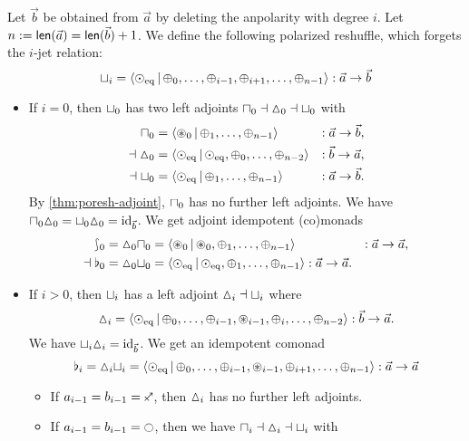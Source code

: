 \documentclass[a4paper]{memoir}
\begin{document}
\begin{example} \label{ex:cohesion}
	Let $\vec b$ be obtained from $\vec a$ by deleting the anpolarity with degree $i$.
	Let $n := \mathsf{len}(\vec a) = \mathsf{len}(\vec b) + 1$.
	We define the following polarized reshuffle, which forgets the $i$-jet relation:
	\[
		{\sqcup}_i = \mathopen{}\left\langle {\odot}_{\mathrm{eq}} \,\middle|\, {\oplus}_0, \ldots, {\oplus}_{i-1}, {\oplus}_{i+1}, \ldots, {\oplus}_{n-1} \right\rangle\mathclose{} : \vec a \to \vec b
	\]
	\begin{itemize}
		\item If $i = 0$, then ${\sqcup}_0$ has two left adjoints ${\sqcap}_0 \dashv {\vartriangle}_0 \dashv {\sqcup}_0$ with
		\begin{align*}
			{\sqcap}_0 &= \mathopen{}\left\langle {\oast}_0 \,\middle|\, {\oplus}_1, \ldots, {\oplus}_{n-1} \right\rangle\mathclose{} &: \vec a \to \vec b, \\
			\dashv
			{\vartriangle}_0 &= \mathopen{}\left\langle {\odot}_{\mathrm{eq}} \,\middle|\, {\odot}_{\mathrm{eq}}, {\oplus}_0, \ldots, {\oplus}_{n-2} \right\rangle\mathclose{} &: \vec b \to \vec a, \\
			\dashv
			{\sqcup}_0 &= \mathopen{}\left\langle {\odot}_{\mathrm{eq}} \,\middle|\, {\oplus}_1, \ldots, {\oplus}_{n-1} \right\rangle\mathclose{} &: \vec a \to \vec b.
		\end{align*}
		By \cref{thm:poresh-adjoint}, ${\sqcap}_0$ has no further left adjoints.
		We have ${\sqcap}_0 {\vartriangle}_0 = {\sqcup}_0 {\vartriangle}_0 = \mathrm{id}_{\vec b}$. We get adjoint idempotent (co)monads
		\begin{align*}
			\rbag_0 = {\vartriangle}_0 {\sqcap}_0 &= \mathopen{}\left\langle {\oast}_0 \,\middle|\, {\oast}_0, {\oplus}_1, \ldots, {\oplus}_{n-1} \right\rangle\mathclose{} &: \vec a \to \vec a, \\
			\dashv
			\flat_0 = {\vartriangle}_0 {\sqcup}_0 &= \mathopen{}\left\langle {\odot}_{\mathrm{eq}} \,\middle|\, {\odot}_{\mathrm{eq}}, {\oplus}_1, \ldots, {\oplus}_{n-1} \right\rangle\mathclose{} : \vec a \to \vec a.
		\end{align*}
		\item If $i > 0$, then ${\sqcup}_i$ has a left adjoint ${\vartriangle}_i \dashv {\sqcup}_i$ where
		\[
			{\vartriangle}_i = \mathopen{}\left\langle {\odot}_{\mathrm{eq}} \,\middle|\, {\oplus}_0, \ldots, {\oplus}_{i-1}, {\oast}_{i-1}, {\oplus}_i, \ldots, {\oplus}_{n-2} \right\rangle\mathclose{} : \vec b \to \vec a.
		\]
		We have ${\sqcup}_i {\vartriangle}_i = \mathrm{id}_{\vec b}$. We get an idempotent comonad
		\[
			\flat_i = {\vartriangle}_i {\sqcup}_i = \mathopen{}\left\langle {\odot}_{\mathrm{eq}} \,\middle|\, {\oplus}_0, \ldots, {\oplus}_{i-1}, {\oast}_{i-1}, {\oplus}_{i+1}, \ldots, {\oplus}_{n-1} \right\rangle\mathclose{} : \vec a \to \vec a
		\]
		\begin{itemize}
			\item If $a_{i-1} = b_{i-1} = \ypolar$, then ${\vartriangle}_i$ has no further left adjoints.
			\item If $a_{i-1} = b_{i-1} = \npolar$, then we have ${\sqcap}_i \dashv {\vartriangle}_i \dashv {\sqcup}_i$ with

\end{itemize}
\end{itemize}
\end{example}
\end{document}
